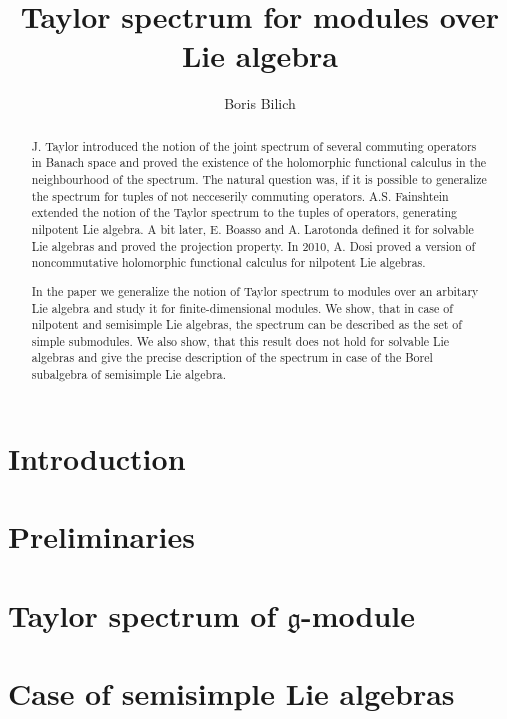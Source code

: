 \documentclass[letterpaper]{amsart}
\author{Boris Bilich}
\title{Taylor spectrum for modules over Lie algebra}
\newcommand{\lieg}{\mathfrak{g}}
\begin{document}
\maketitle

\begin{abstract}
    J. Taylor \cite{Taylor1970} introduced the notion of the joint spectrum of several commuting
    operators in Banach space and proved the existence of the holomorphic functional calculus in
    the neighbourhood of the spectrum. The natural question was, if it is possible to generalize
    the spectrum for tuples of not necceserily commuting operators. A.S. Fainshtein extended the
    notion of the Taylor spectrum to the tuples of operators, generating nilpotent Lie algebra. A
    bit later, E. Boasso and A. Larotonda defined it for solvable Lie algebras and proved the
    projection property. In 2010, A. Dosi proved a version of noncommutative holomorphic functional
    calculus for nilpotent Lie algebras.
    
    In the paper we generalize the notion of Taylor spectrum to modules over an arbitary Lie
    algebra and study it for finite-dimensional modules. We show, that in case of nilpotent and
    semisimple Lie algebras, the spectrum can be described as the set of simple submodules. We also
    show, that this result does not hold for solvable Lie algebras and give the precise description
    of the spectrum in case of the Borel subalgebra of semisimple Lie algebra.
\end{abstract}

\tableofcontents
\section{Introduction}%
\label{sec:introduction}


\section{Preliminaries}%
\label{sec:preliminaries}


\section{Taylor spectrum of \texorpdfstring{$\lieg$-module}{g-module}}%
\label{sec:spectrumofmodule}


\section{Case of semisimple Lie algebras}%
\label{sec:semisimple}

\end{document}
